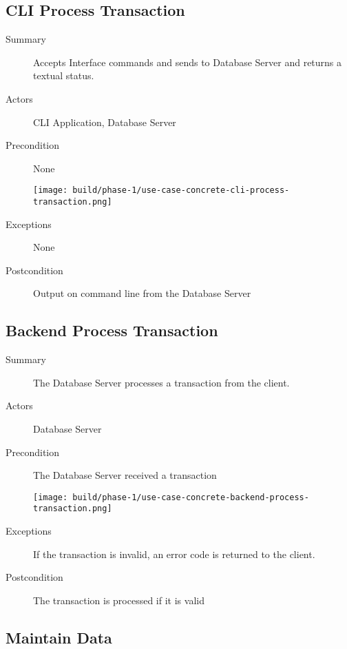 \documentclass[a4paper]{report}
\begin{document}
	\pagebreak

	\subsection{CLI Process Transaction}

	\begin{description}
		\item[Summary] Accepts Interface commands and sends to Database Server and returns a textual status.
		\item[Actors] CLI Application, Database Server
		\item[Precondition] None

		\begin{center}
			\texttt{[image: build/phase-1/use-case-concrete-cli-process-transaction.png]}
		\end{center}

		\item[Exceptions] None
		\item[Postcondition] Output on command line from the Database Server
	\end{description}

	\pagebreak

	\subsection{Backend Process Transaction}

	\begin{description}
		\item[Summary] The Database Server processes a transaction from the client.
		\item[Actors] Database Server
		\item[Precondition] The Database Server received a transaction

		\begin{center}
			\texttt{[image: build/phase-1/use-case-concrete-backend-process-transaction.png]}
		\end{center}

		\item[Exceptions] If the transaction is invalid, an error code is returned to the client.
		\item[Postcondition] The transaction is processed if it is valid
	\end{description}
	
	\pagebreak

	\subsection{Maintain Data}
\end{document}
